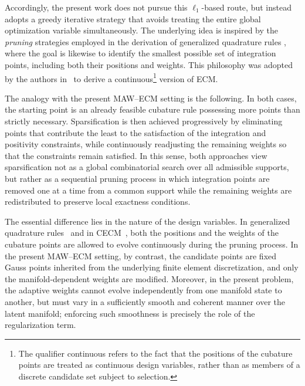 \documentclass[11pt,a4paper]{article}
\begin{document}
Accordingly, the present work does not pursue this \(\ell_1\)-based route, but
instead adopts a greedy iterative strategy that avoids treating the entire
global optimization variable simultaneously. The underlying idea is inspired by
the \emph{pruning} strategies employed in the derivation of generalized
quadrature rules \cite{bremer2010nonlinear,xiao2010numerical}, where the goal
is likewise to identify the smallest possible set of integration points,
including both their positions and weights. This philosophy was adopted by the
authors in~\cite{hernandez2024cecm} to derive a
continuous\footnote{The qualifier continuous refers to the fact that the
positions of the cubature points are treated as continuous design variables,
rather than as members of a discrete candidate set subject to selection.}
version of ECM.


The analogy with the present MAW--ECM setting is the following. In both cases,
the starting point is an already feasible cubature rule possessing more points
than strictly necessary. Sparsification is then achieved progressively by
eliminating points that contribute the least to the satisfaction of the
integration and positivity constraints, while continuously readjusting the
remaining weights so that the constraints remain satisfied. In this sense,
both approaches view sparsification not as a global combinatorial search over
all admissible supports, but rather as a sequential pruning process in which
integration points are removed one at a time from a common support while the
remaining weights are redistributed to preserve local exactness conditions.

The essential difference lies in the nature of the design variables. In
generalized quadrature rules~\cite{bremer2010nonlinear,xiao2010numerical} and
in CECM~\cite{hernandez2024cecm}, both the positions and the weights of the
cubature points are allowed to evolve continuously during the pruning process.
In the present MAW--ECM setting, by contrast, the candidate points are fixed
Gauss points inherited from the underlying finite element discretization, and
only the manifold-dependent weights are modified. Moreover, in the present problem, the adaptive weights cannot evolve
independently from one manifold state to another, but must vary in a
sufficiently smooth and coherent manner over the latent manifold; enforcing
such smoothness is precisely the role of the regularization term.
\end{document}
